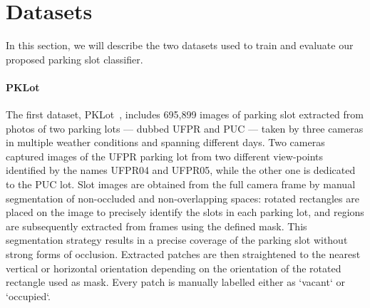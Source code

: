 \section{Datasets}
\label{sec:mini:datasets}

In this section, we will describe the two datasets used to train and evaluate our proposed parking slot classifier.

\paragraph{PKLot}
The first dataset, PKLot~\cite{de2015pklot}, includes 695,899 images of parking slot extracted from photos of two parking lots --- dubbed UFPR and PUC --- taken by three cameras in multiple weather conditions and spanning different days.
Two cameras captured images of the UFPR parking lot from two different view-points identified by the names UFPR04 and UFPR05, while the other one is dedicated to the PUC lot.
Slot images are obtained from the full camera frame by manual segmentation of non-occluded and non-overlapping spaces: rotated rectangles are placed on the image to precisely identify the slots in each parking lot, and regions are subsequently extracted from frames using the defined mask.
This segmentation strategy results in a precise coverage of the parking slot without strong forms of occlusion.
Extracted patches are then straightened to the nearest vertical or horizontal orientation depending on the orientation of the rotated rectangle used as mask.
Every patch is manually labelled either as `vacant` or `occupied`.

